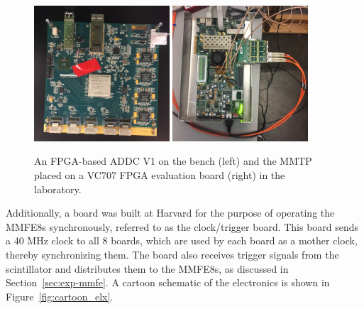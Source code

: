 \begin{figure}[!htpb]
  \begin{center}
    \includegraphics[width=0.45\textwidth]{figures/photos/IMG_0840.JPG}
    \includegraphics[width=0.45\textwidth]{figures/photos/IMG_0836.JPG}
  \end{center}
  \vspace{-10pt}
  \caption{An FPGA-based ADDC V1 on the bench (left) and the MMTP placed on a VC707 FPGA evaluation board (right) in the laboratory.}
  \label{fig:cards}
\end{figure}

Additionally, a board was built at Harvard for the purpose of operating the MMFE8s synchronously, referred to as the clock/trigger board. This board sends a 40 MHz clock to all 8 boards, which are used by each board as a mother clock, thereby synchronizing them. The board also receives trigger signals from the scintillator and distributes them to the MMFE8s, as discussed in Section~\ref{sec:exp-mmfe}. A cartoon schematic of the electronics is shown in Figure~\ref{fig:cartoon_elx}.

